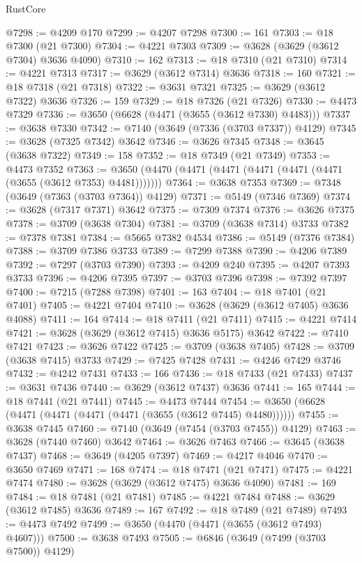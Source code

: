 \begin{lexlean}{RustCore}
\begin{coremodule}
@7298 := @4209 @170
@7299 := @4207 @7298
@7300 := 161
@7303 := @18 @7300 (@21 @7300)
@7304 := @4221 @7303
@7309 := @3628 (@3629 (@3612 @7304) @3636 @4090)
@7310 := 162
@7313 := @18 @7310 (@21 @7310)
@7314 := @4221 @7313
@7317 := @3629 (@3612 @7314) @3636
@7318 := 160
@7321 := @18 @7318 (@21 @7318)
@7322 := @3631 @7321
@7325 := @3629 (@3612 @7322) @3636
@7326 := 159
@7329 := @18 @7326 (@21 @7326)
@7330 := @4473 @7329
@7336 := @3650 (@6628 (@4471 (@3655 (@3612 @7330) @4483)))
@7337 := @3638 @7330
@7342 := @7140 (@3649 (@7336 (@3703 @7337)) @4129)
@7345 := @3628 (@7325 @7342) @3642
@7346 := @3626 @7345
@7348 := @3645 (@3638 @7322)
@7349 := 158
@7352 := @18 @7349 (@21 @7349)
@7353 := @4473 @7352
@7363 := @3650 (@4470 (@4471 (@4471 (@4471 (@4471 (@4471 (@3655 (@3612 @7353) @4481)))))))
@7364 := @3638 @7353
@7369 := @7348 (@3649 (@7363 (@3703 @7364)) @4129)
@7371 := @5149 (@7346 @7369)
@7374 := @3628 (@7317 @7371) @3642
@7375 := @7309 @7374
@7376 := @3626 @7375
@7378 := @3709 (@3638 @7304)
@7381 := @3709 (@3638 @7314) @3733
@7382 := @7378 @7381
@7384 := @5665 @7382 @4534
@7386 := @5149 (@7376 @7384)
@7388 := @3709 @7386 @3733
@7389 := @7299 @7388
@7390 := @4206 @7389
@7392 := @7297 (@3703 @7390)
@7393 := @4209 @240
@7395 := @4207 @7393 @3733
@7396 := @4206 @7395
@7397 := @3703 @7396
@7398 := @7392 @7397
@7400 := @7215 (@7288 @7398)
@7401 := 163
@7404 := @18 @7401 (@21 @7401)
@7405 := @4221 @7404
@7410 := @3628 (@3629 (@3612 @7405) @3636 @4088)
@7411 := 164
@7414 := @18 @7411 (@21 @7411)
@7415 := @4221 @7414
@7421 := @3628 (@3629 (@3612 @7415) @3636 @5175) @3642
@7422 := @7410 @7421
@7423 := @3626 @7422
@7425 := @3709 (@3638 @7405)
@7428 := @3709 (@3638 @7415) @3733
@7429 := @7425 @7428
@7431 := @4246 @7429 @3746
@7432 := @4242 @7431
@7433 := 166
@7436 := @18 @7433 (@21 @7433)
@7437 := @3631 @7436
@7440 := @3629 (@3612 @7437) @3636
@7441 := 165
@7444 := @18 @7441 (@21 @7441)
@7445 := @4473 @7444
@7454 := @3650 (@6628 (@4471 (@4471 (@4471 (@4471 (@3655 (@3612 @7445) @4480))))))
@7455 := @3638 @7445
@7460 := @7140 (@3649 (@7454 (@3703 @7455)) @4129)
@7463 := @3628 (@7440 @7460) @3642
@7464 := @3626 @7463
@7466 := @3645 (@3638 @7437)
@7468 := @3649 (@4205 @7397)
@7469 := @4217 @4046
@7470 := @3650 @7469
@7471 := 168
@7474 := @18 @7471 (@21 @7471)
@7475 := @4221 @7474
@7480 := @3628 (@3629 (@3612 @7475) @3636 @4090)
@7481 := 169
@7484 := @18 @7481 (@21 @7481)
@7485 := @4221 @7484
@7488 := @3629 (@3612 @7485) @3636
@7489 := 167
@7492 := @18 @7489 (@21 @7489)
@7493 := @4473 @7492
@7499 := @3650 (@4470 (@4471 (@3655 (@3612 @7493) @4607)))
@7500 := @3638 @7493
@7505 := @6846 (@3649 (@7499 (@3703 @7500)) @4129)

\end{coremodule}
\end{lexlean}
